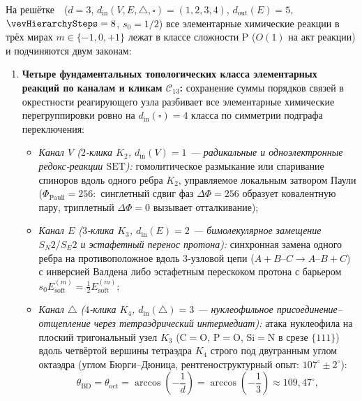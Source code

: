 \begin{theorem}[Классификация четырёх элементарных механизмов химических реакций по каналам $(V,E,\triangle,\square)$ и закон $8 = 3 + 2 + 3$ ферментативного катализа]
\label{thm:bio-four-reaction-mechanisms-and-catalysis-in-p}
На решётке~\latGCKshort\ ($d=3$, $d_{\mathrm{in}}(V,E,\triangle,\square) = (1,2,3,4)$, $d_{\mathrm{out}}(E) = 5$, $\vevHierarchySteps = 8$, $s_0 = 1/2$) все элементарные химические реакции в трёх мирах $m\in\{-1,0,+1\}$ лежат в классе сложности $\mathrm{P}$ ($O(1)$ на акт реакции) и подчиняются двум законам:
\begin{enumerate}[leftmargin=*]
\item \textbf{Четыре фундаментальных топологических класса элементарных реакций по каналам и кликам $\mathcal{C}_{13}$:}
  сохранение суммы порядков связей в окрестности реагирующего узла разбивает все элементарные химические перегруппировки ровно на $d_{\mathrm{in}}(\square) = 4$ класса по симметрии подграфа переключения:
  \begin{itemize}[leftmargin=*,noitemsep]
  \item \emph{Канал $V$ ($2$-клика $K_2$, $d_{\mathrm{in}}(V)=1$ --- радикальные и одноэлектронные редокс-реакции $\mathrm{SET}$):} гомолитическое размыкание или спаривание спиноров вдоль одного ребра $K_2$, управляемое локальным затвором Паули ($\Phi_{\mathrm{Pauli}}=256\colon$ синглетный сдвиг фаз $\Delta\Phi = 256$ образует ковалентную пару, триплетный $\Delta\Phi = 0$ вызывает отталкивание);
  \item \emph{Канал $E$ ($3$-клика $K_3$, $d_{\mathrm{in}}(E)=2$ --- бимолекулярное замещение $S_N2/S_E2$ и эстафетный перенос протона):} синхронная замена одного ребра на противоположное вдоль $3$-узловой цепи ($A + B\text{--}C \to A\text{--}B + C$) с инверсией Валдена либо эстафетным перескоком протона с барьером $s_0 E_{\mathrm{soft}}^{(m)} = \frac{1}{2}E_{\mathrm{soft}}^{(m)}$;
  \item \emph{Канал $\triangle$ ($4$-клика $K_4$, $d_{\mathrm{in}}(\triangle)=3$ --- нуклеофильное присоединение--отщепление через тетраэдрический интермедиат):} атака нуклеофила на плоский тригональный узел $K_3$ ($\mathrm{C{=}O}$, $\mathrm{P{=}O}$, $\mathrm{Si{=}N}$ в срезе $\{111\}$) вдоль четвёртой вершины тетраэдра $K_4$ строго под двугранным углом октаэдра (углом Бюрги--Дюница, рентгеноструктурный опыт: $107^\circ \pm 2^\circ$):
    \begin{equation}
    \label{eq:bio-burgi-dunitz-angle}
      \theta_{\mathrm{BD}} = \theta_{\mathrm{oct}} = \arccos\!\left(-\frac{1}{d}\right) = \arccos\!\left(-\frac{1}{3}\right) \approx 109{,}47^\circ,

\end{equation}
\end{itemize}
\end{enumerate}
\end{theorem}
